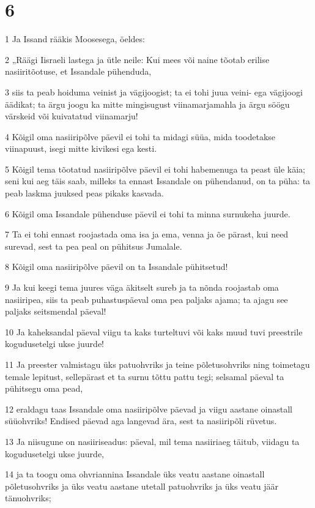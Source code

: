 \chapter{6}

\par 1 Ja Issand rääkis Moosesega, öeldes:
\par 2 „Räägi Iisraeli lastega ja ütle neile: Kui mees või naine tõotab erilise nasiiritõotuse, et Issandale pühenduda,
\par 3 siis ta peab hoiduma veinist ja vägijoogist; ta ei tohi juua veini- ega vägijoogi äädikat; ta ärgu joogu ka mitte mingisugust viinamarjamahla ja ärgu söögu värskeid või kuivatatud viinamarju!
\par 4 Kõigil oma nasiiripõlve päevil ei tohi ta midagi süüa, mida toodetakse viinapuust, isegi mitte kivikesi ega kesti.
\par 5 Kõigil tema tõotatud nasiiripõlve päevil ei tohi habemenuga ta peast üle käia; seni kui aeg täis saab, milleks ta ennast Issandale on pühendanud, on ta püha: ta peab laskma juuksed peas pikaks kasvada.
\par 6 Kõigil oma Issandale pühenduse päevil ei tohi ta minna surnukeha juurde.
\par 7 Ta ei tohi ennast roojastada oma isa ja ema, venna ja õe pärast, kui need surevad, sest ta pea peal on pühitsus Jumalale.
\par 8 Kõigil oma nasiiripõlve päevil on ta Issandale pühitsetud!
\par 9 Ja kui keegi tema juures väga äkitselt sureb ja ta nõnda roojastab oma nasiiripea, siis ta peab puhastuspäeval oma pea paljaks ajama; ta ajagu see paljaks seitsmendal päeval!
\par 10 Ja kaheksandal päeval viigu ta kaks turteltuvi või kaks muud tuvi preestrile kogudusetelgi ukse juurde!
\par 11 Ja preester valmistagu üks patuohvriks ja teine põletusohvriks ning toimetagu temale lepitust, sellepärast et ta surnu tõttu pattu tegi; selsamal päeval ta pühitsegu oma pead,
\par 12 eraldagu taas Issandale oma nasiiripõlve päevad ja viigu aastane oinastall süüohvriks! Endised päevad aga langevad ära, sest ta nasiiripõli rüvetus.
\par 13 Ja niisugune on nasiiriseadus: päeval, mil tema nasiiriaeg täitub, viidagu ta kogudusetelgi ukse juurde,
\par 14 ja ta toogu oma ohvriannina Issandale üks veatu aastane oinastall põletusohvriks ja üks veatu aastane utetall patuohvriks ja üks veatu jäär tänuohvriks;
